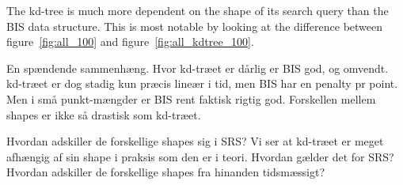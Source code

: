The kd-tree is much more dependent on the shape of its search query than the BIS data structure. This is most notable by looking at the difference between figure~\ref{fig:all_100} and figure~\ref{fig:all_kdtree_100}.


En spændende sammenhæng. Hvor kd-træet er dårlig er BIS god, og omvendt. kd-træet er dog stadig kun præcis lineær i tid, men BIS har en penalty pr point. Men i små punkt-mængder er BIS rent faktisk rigtig god. Forskellen mellem shapes er ikke så drastisk som kd-træet.

Hvordan adskiller de forskellige shapes sig i SRS? Vi ser at kd-træet er meget afhængig af sin shape i praksis som den er i teori. Hvordan gælder det for SRS? Hvordan adskiller de forskellige shapes fra hinanden tidsmæssigt? 
